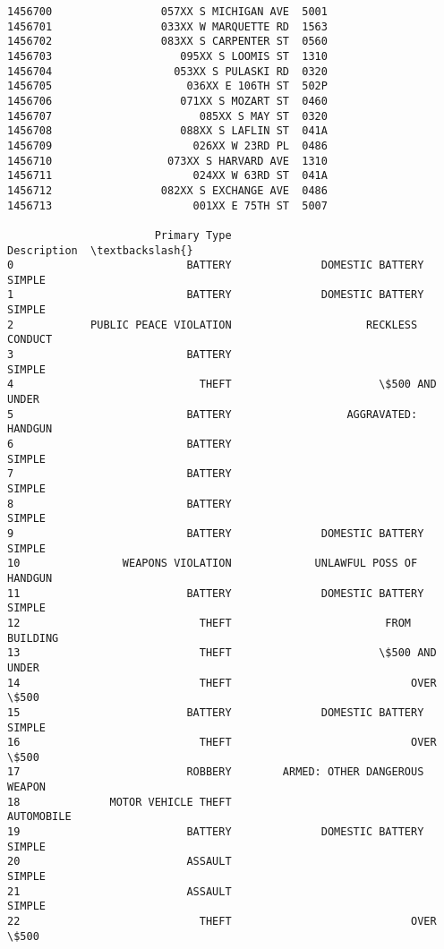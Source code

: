\documentclass[11pt]{article}
\begin{document}
\begin{Verbatim}[commandchars=\\\{\}]
1456700                 057XX S MICHIGAN AVE  5001   
1456701                 033XX W MARQUETTE RD  1563   
1456702                 083XX S CARPENTER ST  0560   
1456703                    095XX S LOOMIS ST  1310   
1456704                   053XX S PULASKI RD  0320   
1456705                     036XX E 106TH ST  502P   
1456706                    071XX S MOZART ST  0460   
1456707                       085XX S MAY ST  0320   
1456708                    088XX S LAFLIN ST  041A   
1456709                      026XX W 23RD PL  0486   
1456710                  073XX S HARVARD AVE  1310   
1456711                      024XX W 63RD ST  041A   
1456712                 082XX S EXCHANGE AVE  0486   
1456713                      001XX E 75TH ST  5007   

                       Primary Type                          Description  \textbackslash{}
0                           BATTERY              DOMESTIC BATTERY SIMPLE   
1                           BATTERY              DOMESTIC BATTERY SIMPLE   
2            PUBLIC PEACE VIOLATION                     RECKLESS CONDUCT   
3                           BATTERY                               SIMPLE   
4                             THEFT                       \$500 AND UNDER   
5                           BATTERY                  AGGRAVATED: HANDGUN   
6                           BATTERY                               SIMPLE   
7                           BATTERY                               SIMPLE   
8                           BATTERY                               SIMPLE   
9                           BATTERY              DOMESTIC BATTERY SIMPLE   
10                WEAPONS VIOLATION             UNLAWFUL POSS OF HANDGUN   
11                          BATTERY              DOMESTIC BATTERY SIMPLE   
12                            THEFT                        FROM BUILDING   
13                            THEFT                       \$500 AND UNDER   
14                            THEFT                            OVER \$500   
15                          BATTERY              DOMESTIC BATTERY SIMPLE   
16                            THEFT                            OVER \$500   
17                          ROBBERY        ARMED: OTHER DANGEROUS WEAPON   
18              MOTOR VEHICLE THEFT                           AUTOMOBILE   
19                          BATTERY              DOMESTIC BATTERY SIMPLE   
20                          ASSAULT                               SIMPLE   
21                          ASSAULT                               SIMPLE   
22                            THEFT                            OVER \$500   

\end{Verbatim}
\end{document}
